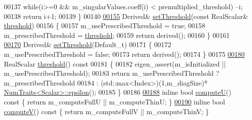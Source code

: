 \begin{DoxyCode}
00137     \textcolor{keywordflow}{while}(i>=0 && m\_singularValues.coeff(i) < premultiplied\_threshold) --i;
00138     \textcolor{keywordflow}{return} i+1;
00139   \}
00140   
\hyperlink{group___s_v_d___module_a1c95d05398fc15e410a28560ef70a5a6}{00155}   Derived& \hyperlink{group___s_v_d___module_a1c95d05398fc15e410a28560ef70a5a6}{setThreshold}(\textcolor{keyword}{const} RealScalar& \hyperlink{group___s_v_d___module_a98b2ee98690358951807353812a05c69}{threshold})
00156   \{
00157     m\_usePrescribedThreshold = \textcolor{keyword}{true};
00158     m\_prescribedThreshold = \hyperlink{group___s_v_d___module_a98b2ee98690358951807353812a05c69}{threshold};
00159     \textcolor{keywordflow}{return} derived();
00160   \}
00161 
\hyperlink{group___s_v_d___module_a27586b69dbfb63f714d1d45fd6304f97}{00170}   Derived& \hyperlink{group___s_v_d___module_a27586b69dbfb63f714d1d45fd6304f97}{setThreshold}(Default\_t)
00171   \{
00172     m\_usePrescribedThreshold = \textcolor{keyword}{false};
00173     \textcolor{keywordflow}{return} derived();
00174   \}
00175 
\hyperlink{group___s_v_d___module_a98b2ee98690358951807353812a05c69}{00180}   RealScalar \hyperlink{group___s_v_d___module_a98b2ee98690358951807353812a05c69}{threshold}()\textcolor{keyword}{ const}
00181 \textcolor{keyword}{  }\{
00182     eigen\_assert(m\_isInitialized || m\_usePrescribedThreshold);
00183     \textcolor{keywordflow}{return} m\_usePrescribedThreshold ? m\_prescribedThreshold
00184                                     : (std::max<Index>)(1,m\_diagSize)*
      \hyperlink{group___core___module_struct_eigen_1_1_num_traits}{NumTraits<Scalar>::epsilon}();
00185   \}
00186 
\hyperlink{group___s_v_d___module_a705a7c2709e1624ccc19aa748a78d473}{00188}   \textcolor{keyword}{inline} \textcolor{keywordtype}{bool} \hyperlink{group___s_v_d___module_a705a7c2709e1624ccc19aa748a78d473}{computeU}()\textcolor{keyword}{ const }\{ \textcolor{keywordflow}{return} m\_computeFullU || m\_computeThinU; \}
\hyperlink{group___s_v_d___module_a5f12efcb791eb007d4a4890ac5255ac4}{00190}   \textcolor{keyword}{inline} \textcolor{keywordtype}{bool} \hyperlink{group___s_v_d___module_a5f12efcb791eb007d4a4890ac5255ac4}{computeV}()\textcolor{keyword}{ const }\{ \textcolor{keywordflow}{return} m\_computeFullV || m\_computeThinV; \}

\end{DoxyCode}

